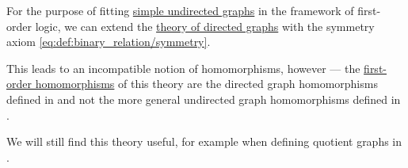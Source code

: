 \begin{remark}\label{rem:theory_of_simple_undirected_graphs}
  For the purpose of fitting \hyperref[def:undirected_graph]{simple undirected graphs} in the framework of first-order logic, we can extend the \hyperref[def:directed_graph/theory]{theory of directed graphs} with the symmetry axiom \eqref{eq:def:binary_relation/symmetry}.

  This leads to an incompatible notion of homomorphisms, however --- the \hyperref[def:first_order_homomorphism]{first-order homomorphisms} of this theory are the directed graph homomorphisms defined in  and not the more general undirected graph homomorphisms defined in .

  We will still find this theory useful, for example when defining quotient graphs in .
\end{remark}

